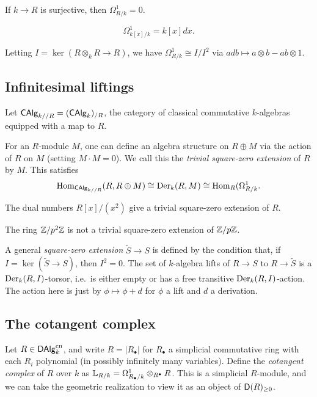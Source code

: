\documentclass{amsart}
\begin{document}
\begin{ex}
	If $k \to R$ is surjective, then $\Omega^1_{R/k} = 0$.
\end{ex}

\begin{ex}
	\[
		\Omega^1_{k[x]/k} = k[x] dx.
	\]
\end{ex}

\begin{ex}
	Letting $I = \ker(R \otimes_k R \to R)$, we have $\Omega^1_{R/k} \cong I / I^2$ via $a db \mapsto a \otimes b - ab \otimes 1$.
\end{ex}

\subsection{Infinitesimal liftings}

Let $\mathsf{CAlg}_{k//R} = (\mathsf{CAlg}_k)_{/R}$, the category of classical commutative $k$-algebras equipped with a map to $R$.

For an $R$-module $M$, one can define an algebra structure on $R \oplus M$ via the action of $R$ on $M$ (setting $M \cdot M = 0$).
We call this the \emph{trivial square-zero extension} of $R$ by $M$.
This satisfies
\[
	\operatorname{Hom}_{\mathsf{CAlg}_{k//R}}(R, R \oplus M) \cong \operatorname{Der}_k(R, M) \cong \operatorname{Hom}_R(\Omega^1_{R/k}.
\]

\begin{ex}
	The dual numbers $R[x] / (x^2)$ give a trivial square-zero extension of $R$.
\end{ex}

\begin{ex}
	The ring $\mathbb{Z} / p^2 \mathbb{Z}$ is not a trivial square-zero extension of $\mathbb{Z} / p \mathbb{Z}$.
\end{ex}

A general \emph{square-zero extension} $\tilde{S} \to S$ is defined by the condition that, if $I = \ker(\tilde{S} \to S)$, then $I^2 = 0$.
The set of $k$-algebra lifts of $R \to S$ to $R \to \tilde{S}$ is a $\operatorname{Der}_k(R, I)$-torsor, i.e.\ is either empty or has a free transitive $\operatorname{Der}_k(R, I)$-action.
The action here is just by $\phi \mapsto \phi + d$ for $\phi$ a lift and $d$ a derivation.

\subsection{The cotangent complex}

\begin{dfn}
	Let $R \in \mathsf{DAlg}_k^{\mathrm{cn}}$, and write $R = |R_\bullet|$ for $R_\bullet$ a simplicial commutative ring with each $R_i$ polynomial (in possibly infinitely many variables).
	Define the \emph{cotangent complex} of $R$ over $k$ as $\mathbb{L}_{R/k} = \Omega^1_{R_\bullet/k} \otimes_{R^\bullet} R$.
	This is a simplicial $R$-module, and we can take the geometric realization to view it as an object of $\mathsf{D}(R)_{\geq 0}$.
\end{dfn}
\end{document}
